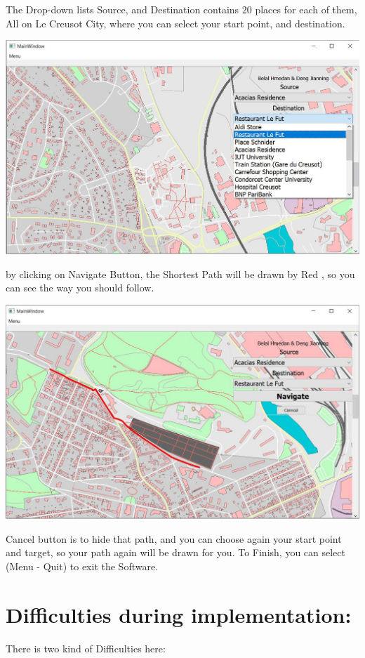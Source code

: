 \documentclass[a4paper, 12pt, english]{book}
\begin{document}
The Drop-down lists Source, and Destination contains 20 places for each of them, All on Le Creusot City, where you can select your start point, and destination.
\begin{center}
\includegraphics[width=.6\textwidth]{GUI_Map1.JPG}
\end{center}
by clicking on Navigate Button, the Shortest Path will be drawn by Red , so you can see the way you should follow.
\begin{center}
\includegraphics[width=.6\textwidth]{GUI_Map2.JPG}
\end{center}
Cancel button is to hide that path, and you can choose again your start point and target, so your path again will be drawn for you.
To Finish, you can select (Menu - Quit) to exit the Software.





\section{Difficulties during implementation:}
There is two kind of Difficulties here:
\end{document}
